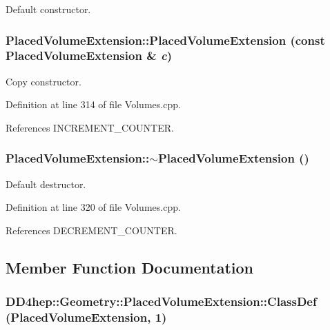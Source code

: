 Default constructor. \hypertarget{class_d_d4hep_1_1_geometry_1_1_placed_volume_extension_ae6ed2e13f9d86072e773573b7d710e1b}{
\subsubsection[{PlacedVolumeExtension}]{\setlength{\rightskip}{0pt plus 5cm}PlacedVolumeExtension::PlacedVolumeExtension (const {\bf PlacedVolumeExtension} \& {\em c})}}
\label{class_d_d4hep_1_1_geometry_1_1_placed_volume_extension_ae6ed2e13f9d86072e773573b7d710e1b}


Copy constructor. 

Definition at line 314 of file Volumes.cpp.

References INCREMENT\_\-COUNTER.\hypertarget{class_d_d4hep_1_1_geometry_1_1_placed_volume_extension_a99c666d418ebb75722ab794442169d72}{
\subsubsection[{$\sim$PlacedVolumeExtension}]{\setlength{\rightskip}{0pt plus 5cm}PlacedVolumeExtension::$\sim$PlacedVolumeExtension ()}}
\label{class_d_d4hep_1_1_geometry_1_1_placed_volume_extension_a99c666d418ebb75722ab794442169d72}


Default destructor. 

Definition at line 320 of file Volumes.cpp.

References DECREMENT\_\-COUNTER.

\subsection{Member Function Documentation}
\hypertarget{class_d_d4hep_1_1_geometry_1_1_placed_volume_extension_a947783c6c9088c7569f0fdd90a330a39}{
\subsubsection[{ClassDef}]{\setlength{\rightskip}{0pt plus 5cm}DD4hep::Geometry::PlacedVolumeExtension::ClassDef ({\bf PlacedVolumeExtension}, \/  1)}}
\label{class_d_d4hep_1_1_geometry_1_1_placed_volume_extension_a947783c6c9088c7569f0fdd90a330a39}



